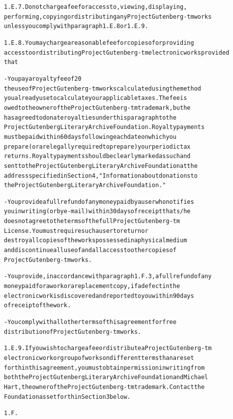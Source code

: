 \documentclass[12pt]{book}[2005/09/16]
\newenvironment{PGtext}{%
\begin{alltt}
\fontsize{8.1}{10}\ttfamily\selectfont}%
{\end{alltt}}
\renewcommand{\(}{{\upshape(}}
\renewcommand{\)}{{\upshape)}}
\begin{document}
\begin{PGtext}
1.E.7.  Do not charge a fee for access to, viewing, displaying,
performing, copying or distributing any Project Gutenberg-tm works
unless you comply with paragraph 1.E.8 or 1.E.9.

1.E.8.  You may charge a reasonable fee for copies of or providing
access to or distributing Project Gutenberg-tm electronic works provided
that

- You pay a royalty fee of 20%
     the use of Project Gutenberg-tm works calculated using the method
     you already use to calculate your applicable taxes.  The fee is
     owed to the owner of the Project Gutenberg-tm trademark, but he
     has agreed to donate royalties under this paragraph to the
     Project Gutenberg Literary Archive Foundation.  Royalty payments
     must be paid within 60 days following each date on which you
     prepare (or are legally required to prepare) your periodic tax
     returns.  Royalty payments should be clearly marked as such and
     sent to the Project Gutenberg Literary Archive Foundation at the
     address specified in Section 4, "Information about donations to
     the Project Gutenberg Literary Archive Foundation."

- You provide a full refund of any money paid by a user who notifies
     you in writing (or by e-mail) within 30 days of receipt that s/he
     does not agree to the terms of the full Project Gutenberg-tm
     License.  You must require such a user to return or
     destroy all copies of the works possessed in a physical medium
     and discontinue all use of and all access to other copies of
     Project Gutenberg-tm works.

- You provide, in accordance with paragraph 1.F.3, a full refund of any
     money paid for a work or a replacement copy, if a defect in the
     electronic work is discovered and reported to you within 90 days
     of receipt of the work.

- You comply with all other terms of this agreement for free
     distribution of Project Gutenberg-tm works.

1.E.9.  If you wish to charge a fee or distribute a Project Gutenberg-tm
electronic work or group of works on different terms than are set
forth in this agreement, you must obtain permission in writing from
both the Project Gutenberg Literary Archive Foundation and Michael
Hart, the owner of the Project Gutenberg-tm trademark.  Contact the
Foundation as set forth in Section 3 below.

1.F.


\end{PGtext}
\end{document}
